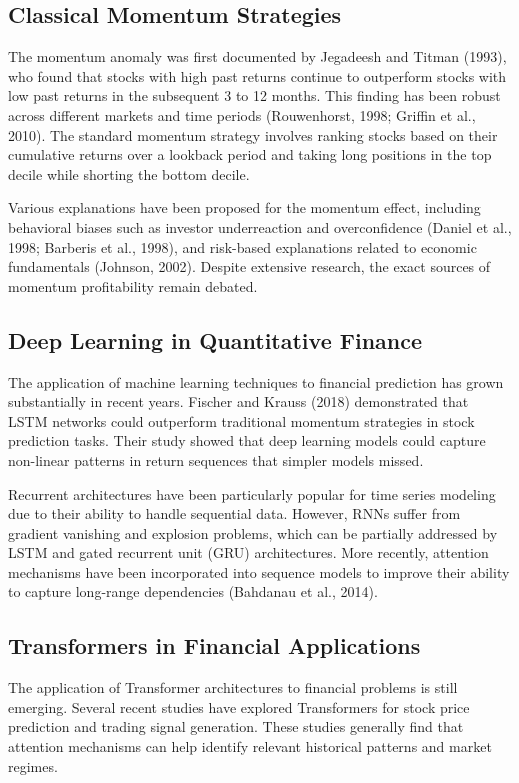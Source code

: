 \documentclass[preprint,authoryear,12pt]{elsarticle}
\begin{document}
\subsection{Classical Momentum Strategies}

The momentum anomaly was first documented by Jegadeesh and Titman (1993), who found that stocks with high past returns continue to outperform stocks with low past returns in the subsequent 3 to 12 months. This finding has been robust across different markets and time periods (Rouwenhorst, 1998; Griffin et al., 2010). The standard momentum strategy involves ranking stocks based on their cumulative returns over a lookback period and taking long positions in the top decile while shorting the bottom decile.

Various explanations have been proposed for the momentum effect, including behavioral biases such as investor underreaction and overconfidence (Daniel et al., 1998; Barberis et al., 1998), and risk-based explanations related to economic fundamentals (Johnson, 2002). Despite extensive research, the exact sources of momentum profitability remain debated.

\subsection{Deep Learning in Quantitative Finance}

The application of machine learning techniques to financial prediction has grown substantially in recent years. Fischer and Krauss (2018) demonstrated that LSTM networks could outperform traditional momentum strategies in stock prediction tasks. Their study showed that deep learning models could capture non-linear patterns in return sequences that simpler models missed.

Recurrent architectures have been particularly popular for time series modeling due to their ability to handle sequential data. However, RNNs suffer from gradient vanishing and explosion problems, which can be partially addressed by LSTM and gated recurrent unit (GRU) architectures. More recently, attention mechanisms have been incorporated into sequence models to improve their ability to capture long-range dependencies (Bahdanau et al., 2014).

\subsection{Transformers in Financial Applications}

The application of Transformer architectures to financial problems is still emerging. Several recent studies have explored Transformers for stock price prediction and trading signal generation. These studies generally find that attention mechanisms can help identify relevant historical patterns and market regimes.
\end{document}
